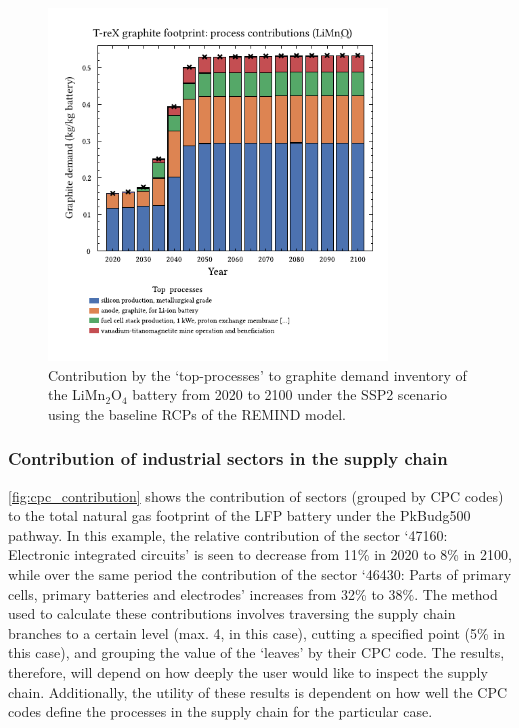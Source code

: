 \documentclass[a4paper,fleqn]{cas-dc}
\begin{document}
\begin{figure}[htbp]
	\centering
	\includegraphics[width=9cm]{figs/T-reX-wastefootprint-processcontributions.pdf}
	\caption{Contribution by the `top-processes' to graphite demand inventory of the LiMn\(_2\)O\(_4\) battery from 2020 to 2100 under the SSP2 scenario using the baseline RCPs of the REMIND model.}\label{fig:top_contribution}
\end{figure}


\subsubsection{Contribution of industrial sectors in the supply chain}\label{sec:results-case_study-topsectors}

\autoref{fig:cpc_contribution} shows the contribution of sectors (grouped by CPC codes) to the total natural gas footprint of the LFP battery under the PkBudg500 pathway. In this example, the relative contribution of the sector `47160: Electronic integrated circuits' is seen to decrease from 11\% in 2020 to 8\% in 2100, while over the same period the contribution of the sector `46430: Parts of primary cells, primary batteries and electrodes' increases from 32\% to 38\%. The method used to calculate these contributions involves traversing the supply chain branches to a certain level (max. 4, in this case), cutting a specified point (5\% in this case), and grouping the value of the `leaves' by their CPC code. The results, therefore, will depend on how deeply the user would like to inspect the supply chain. Additionally, the utility of these results is dependent on how well the CPC codes define the processes in the supply chain for the particular case.
\end{document}
